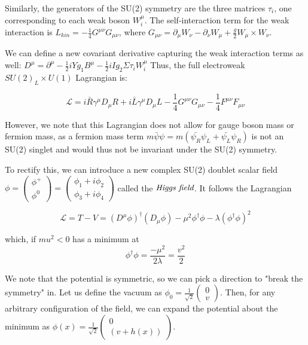 Similarly, the generators of the SU(2) symmetry are the three matrices $\tau_{i}$, one corresponding to each weak boson $W^{\mu}_{i}$. The self-interaction term for the weak interaction is $L_{kin} = -\frac{1}{4}G^{\mu \nu}G_{\mu \nu}$, where $G_{\mu \nu} = \partial_{\mu} W_{\nu} - \partial_{\nu} W_{\mu}+\frac{g}{2} W_{\mu}\times W_{\nu}$.

We can define a new covariant derivative capturing the weak interaction terms as well: $D^{\mu} = \partial^{\mu}- \frac{1}{2}iYg_{1}B^{\mu} -\frac{1}{2}i I g_2 \Sigma \tau_{i}W_{i}^\mu$ Thus, the full electroweak $SU(2)_L \times U(1)$ Lagrangian is:

\begin{equation}
\mathcal{L} = i\bar{R}\gamma^{\mu}D_{\mu}R + i\bar{L}\gamma^{\mu}D_{\mu}L -\frac{1}{4}G^{\mu \nu}G_{\mu \nu} -\frac{1}{4}F^{\mu \nu} F_{\mu \nu}
\end{equation}

However, we note that this Lagrangian does not allow for gauge boson mass or fermion mass, as a fermion mass term $m\bar{\psi}\psi = m(\bar{\psi_{R}}\psi_{L}+\bar{\psi_{L}}\psi_{R})$ is not an SU(2) singlet and would thus not be invariant under the SU(2) symmetry. 

To rectify this, we can introduce a new complex SU(2) doublet scalar field $\phi = \begin{pmatrix} \phi^{+} \\ \phi^{0} \end{pmatrix} = \begin{pmatrix} \phi_{1} + i\phi_{2}  \\ \phi_{3} + i\phi_{4} \end{pmatrix}$ called the $\emph{Higgs field}$. It follows the Lagrangian

\begin{equation}
\mathcal{L} = T-V = (D^{\mu}\phi)^{\dag}(D_{\mu}\phi) - {\mu}^2\phi^{\dag}\phi - \lambda(\phi^{\dag}\phi)^{2}
\end{equation}

which, if $mu^{2} < 0$ has a minimum at
\begin{equation}
\phi^{\dag}\phi = \frac{-\mu^{2}}{2 \lambda} = \frac{v^{2}}{2}
\end{equation}

We note that the potential is symmetric, so we can pick a direction to "break the symmetry" in. Let us define the vacuum as $\phi_0 = \frac{1}{\sqrt{2}} \begin{pmatrix} 0 \\ v \end{pmatrix}$. Then, for any arbitrary configuration of the field, we can expand the potential about the minimum as $\phi(x) = \frac{1}{\sqrt{2}} \begin{pmatrix} 0 \\ (v + h(x)) \end{pmatrix}$.

